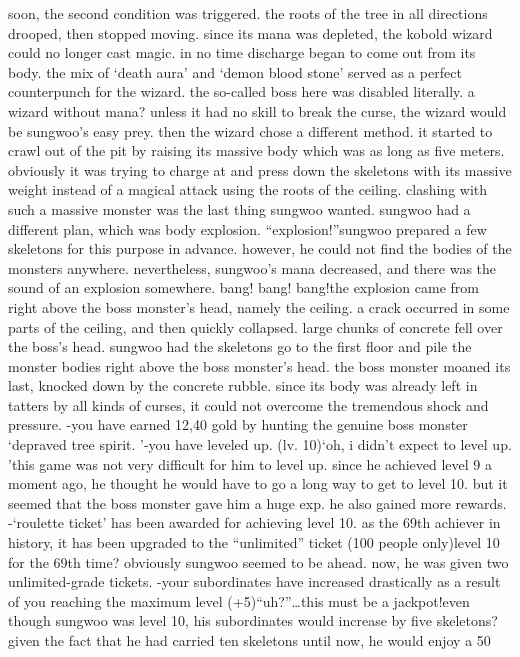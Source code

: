 soon, the second condition was triggered.
 the roots of the tree in all directions drooped, then stopped moving.
 since its mana was depleted, the kobold wizard could no longer cast magic.
 in no time discharge began to come out from its body.
 the mix of ‘death aura’ and ‘demon blood stone’ served as a perfect counterpunch for the wizard.
 the so-called boss here was disabled literally.
a wizard without mana? unless it had no skill to break the curse, the wizard would be sungwoo’s easy prey.
then the wizard chose a different method.
 it started to crawl out of the pit by raising its massive body which was as long as five meters.
 obviously it was trying to charge at and press down the skeletons with its massive weight instead of a magical attack using the roots of the ceiling.
 clashing with such a massive monster was the last thing sungwoo wanted.
sungwoo had a different plan, which was body explosion.
“explosion!”sungwoo prepared a few skeletons for this purpose in advance.
 however, he could not find the bodies of the monsters anywhere.
 nevertheless, sungwoo’s mana decreased, and there was the sound of an explosion somewhere.
bang! bang! bang!the explosion came from right above the boss monster’s head, namely the ceiling.
a crack occurred in some parts of the ceiling, and then quickly collapsed.
 large chunks of concrete fell over the boss’s head.
sungwoo had the skeletons go to the first floor and pile the monster bodies right above the boss monster’s head.
the boss monster moaned its last, knocked down by the concrete rubble.
since its body was already left in tatters by all kinds of curses, it could not overcome the tremendous shock and pressure.
-you have earned 12,40 gold by hunting the genuine boss monster ‘depraved tree spirit.
’-you have leveled up.
 (lv.
 10)‘oh, i didn’t expect to level up.
’this game was not very difficult for him to level up.
 since he achieved level 9 a moment ago, he thought he would have to go a long way to get to level 10.
 but it seemed that the boss monster gave him a huge exp.
 he also gained more rewards.
-‘roulette ticket’ has been awarded for achieving level 10.
as the 69th achiever in history, it has been upgraded to the “unlimited” ticket (100 people only)level 10 for the 69th time? obviously sungwoo seemed to be ahead.
now, he was given two unlimited-grade tickets.
-your subordinates have increased drastically as a result of you reaching the maximum level (+5)“uh?”…this must be a jackpot!even though sungwoo was level 10, his subordinates would increase by five skeletons? given the fact that he had carried ten skeletons until now, he would enjoy a 50%
